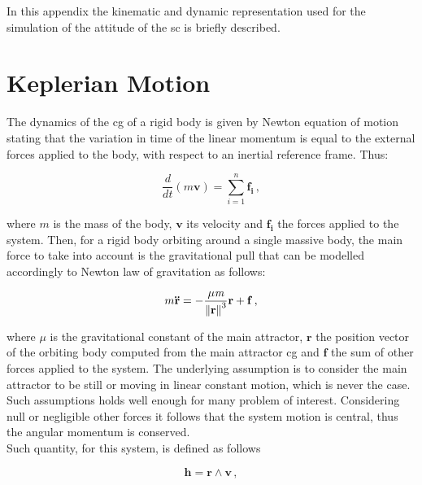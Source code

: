In this appendix the kinematic and dynamic representation used for the simulation of the attitude of the \acrshort{sc} is briefly described.

\section{Keplerian Motion}
The dynamics of the \acrshort{cg} of a rigid body is given by Newton equation of motion stating that the variation in time of the linear momentum is equal to the external forces applied to the body, with respect to an inertial reference frame. Thus:

\begin{equation}
  \frac{d}{dt} (\textit{m} \mathbf{v}) = \sum\limits_{i=1}^n \mathbf{f_i} \,,
\end{equation}

where $\textit{m}$ is the mass of the body, $\mathbf{v}$ its velocity and $\mathbf{f_i}$ the forces applied to the system. Then, for a rigid body orbiting around a single massive body, the main force to take into account is the gravitational pull that can be modelled accordingly to Newton law of gravitation as follows:

\begin{equation}
  \label{eqn:orbiteqtn}
  m \mathbf{\ddot{r}} = - \frac{\mu \textit{m}} {\left\lVert\mathbf{r}\right\rVert^3} \mathbf{r} + \mathbf{f} \,,
\end{equation}

where $\mu$ is the gravitational constant of the main attractor, $\mathbf{r}$ the position vector of the orbiting body computed from the main attractor \acrshort{cg} and $\mathbf{f}$ the sum of other forces applied to the system. The underlying assumption is to consider the main attractor to be still or moving in linear constant motion, which is never the case. Such assumptions holds well enough for many problem of interest. Considering null or negligible other forces it follows that the system motion is central, thus the angular momentum is conserved.\\
Such quantity, for this system, is defined as follows

\begin{equation}
  \mathbf{h} = \mathbf{r} \wedge \mathbf{v} \,,
\end{equation}

